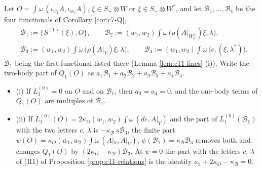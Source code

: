 \begin{lemma}
\label{lem:c11-cocycle}
Let $O=\int\omega\,(\iota_{w_1}A,\iota_{w_2}A)$, $\xi\in S_+\otimes W$ or $\xi\in S_-\otimes W^*$, and let $\mathcal B_1,\dots,\mathcal B_4$ be the four functionals of Corollary \ref{cor:c7-Q},
\[
\begin{aligned}
&\mathcal B_1:=\{S^{(1)}(\xi),O\},\qquad \mathcal B_2:=(w_1,w_2)\int\omega\,\big(\rho(A|_{W_{\mathbb R}^\perp})\xi,\lambda\big),\\
&\mathcal B_3:=(w_1,w_2)\int\omega\,\big(\rho(A|_V)\xi,\lambda\big),\qquad \mathcal B_4:=(w_1,w_2)\int\omega\,\big(c,(\xi,\lambda^*)\big),
\end{aligned}
\]
$\mathcal B_1$ being the first functional listed there (Lemma \ref{lem:c11-lines} (i)). Write the two-body part of $Q_1(O)$ as $a_1\mathcal B_1+a_2\mathcal B_2+a_3\mathcal B_3+a_4\mathcal B_4$.
\begin{itemize}
\item (i) If $L_1^{(0)}=0$ on $O$ and on $\mathcal B_1$, then $a_3=a_4=0$, and the one-body terms of $Q_1(O)$ are multiples of $\mathcal B_1$.
\item (ii) If $L_1^{(0)}(O)=2\kappa_O(w_1,w_2)\int\omega\,(dc,A|_V)$ and the part of $L_1^{(0)}(\mathcal B_1)$ with the two letters $c$, $\lambda$ is $-\kappa_{\mathcal B}\,s\mathcal B_3$, the finite part $\psi(O)=\kappa_O(w_1,w_2)\int\omega\,(A|_V,A|_V)$, $\psi(\mathcal B_1)=\kappa_{\mathcal B}\mathcal B_3$ removes both and changes $Q_1(O)$ by $(2\kappa_O-\kappa_{\mathcal B})\mathcal B_3$. At $\psi=0$ the part with the letters $c$, $\lambda$ of (R1) of Proposition \ref{prop:c11-relations} is the identity $a_3+2\kappa_O-\kappa_{\mathcal B}=0$.
\end{itemize}
\end{lemma}

